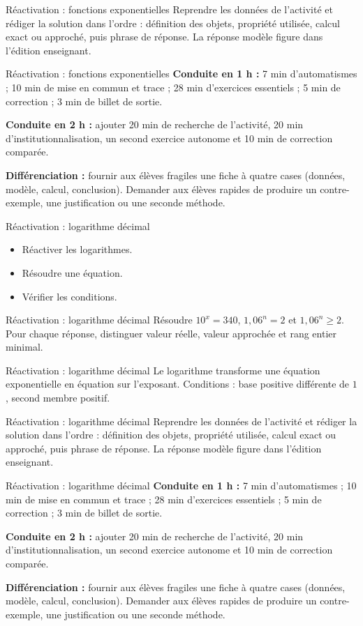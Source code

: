 \documentclass[aspectratio=169,10pt]{beamer}
\begin{document}
\begin{frame}{Réactivation : fonctions exponentielles}
Reprendre les données de l'activité et rédiger la solution dans l'ordre : définition des objets, propriété utilisée, calcul exact ou approché, puis phrase de réponse. La réponse modèle figure dans l'édition enseignant.
\end{frame}
\begin{frame}{Réactivation : fonctions exponentielles}
\textbf{Conduite en 1 h :} 7 min d'automatismes ; 10 min de mise en commun et trace ; 28 min d'exercices essentiels ; 5 min de correction ; 3 min de billet de sortie.

\textbf{Conduite en 2 h :} ajouter 20 min de recherche de l'activité, 20 min d'institutionnalisation, un second exercice autonome et 10 min de correction comparée.

\textbf{Différenciation :} fournir aux élèves fragiles une fiche à quatre cases (données, modèle, calcul, conclusion). Demander aux élèves rapides de produire un contre-exemple, une justification ou une seconde méthode.
\end{frame}
\begin{frame}{Réactivation : logarithme décimal}
\begin{itemize}
\item Réactiver les logarithmes.
\item Résoudre une équation.
\item Vérifier les conditions.

\end{itemize}
\end{frame}
\begin{frame}{Réactivation : logarithme décimal}
Résoudre \(10^x=340\), \(1{,}06^n=2\) et \(1{,}06^n\geq2\). Pour chaque réponse, distinguer valeur réelle, valeur approchée et rang entier minimal.
\end{frame}
\begin{frame}{Réactivation : logarithme décimal}
Le logarithme transforme une équation exponentielle en équation sur l'exposant. Conditions : base positive différente de \(1\), second membre positif.
\end{frame}
\begin{frame}{Réactivation : logarithme décimal}
Reprendre les données de l'activité et rédiger la solution dans l'ordre : définition des objets, propriété utilisée, calcul exact ou approché, puis phrase de réponse. La réponse modèle figure dans l'édition enseignant.
\end{frame}
\begin{frame}{Réactivation : logarithme décimal}
\textbf{Conduite en 1 h :} 7 min d'automatismes ; 10 min de mise en commun et trace ; 28 min d'exercices essentiels ; 5 min de correction ; 3 min de billet de sortie.

\textbf{Conduite en 2 h :} ajouter 20 min de recherche de l'activité, 20 min d'institutionnalisation, un second exercice autonome et 10 min de correction comparée.

\textbf{Différenciation :} fournir aux élèves fragiles une fiche à quatre cases (données, modèle, calcul, conclusion). Demander aux élèves rapides de produire un contre-exemple, une justification ou une seconde méthode.
\end{frame}
\end{document}
